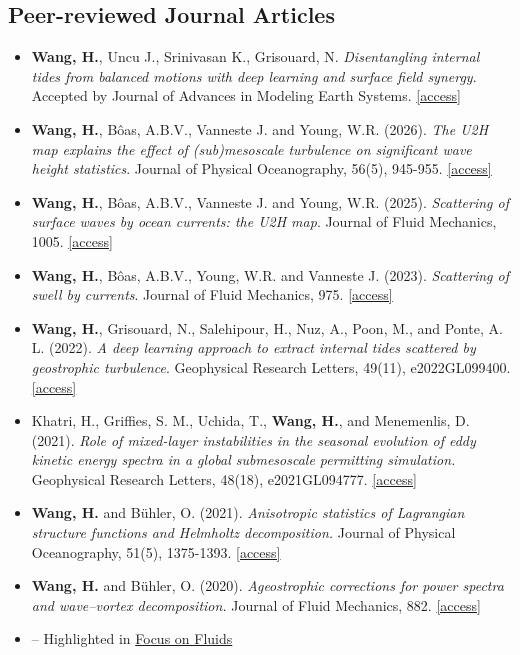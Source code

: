 \documentclass[a4paper,12pt]{article}
\begin{document}
\subsection{Peer-reviewed Journal Articles}
\begin{itemize}
\item \textbf{Wang, H.}, Uncu J., Srinivasan K., Grisouard, N. \textit{Disentangling internal tides from balanced motions with deep learning and surface field synergy}. Accepted by Journal of Advances in Modeling Earth Systems. \href{https://arxiv.org/html/2511.03614v2}{[access]}
\item \textbf{Wang, H.}, B\^{o}as, A.B.V.,  Vanneste J. and Young, W.R. (2026). \textit{The U2H map explains the effect of (sub)mesoscale turbulence on significant wave height statistics}. Journal of Physical Oceanography, 56(5), 945-955. \href{https://arxiv.org/abs/2504.21736}{[access]}
\item \textbf{Wang, H.}, B\^{o}as, A.B.V.,  Vanneste J. and Young, W.R. (2025). \textit{Scattering of surface waves by ocean currents: the U2H map}. Journal of Fluid Mechanics,  1005. \href{https://arxiv.org/abs/2402.05652}{[access]}
\item \textbf{Wang, H.}, B\^{o}as, A.B.V., Young, W.R. and Vanneste J. (2023). \textit{Scattering of swell by currents}. Journal of Fluid Mechanics, 975.  \href{https://arxiv.org/abs/2305.12163}{[access]}
\item \textbf{Wang, H.}, Grisouard, N., Salehipour, H., Nuz, A., Poon, M., and Ponte, A. L. (2022). \textit{A deep learning approach to extract internal tides scattered by geostrophic turbulence}. Geophysical Research Letters, 49(11), e2022GL099400. \href{https://essopenarchive.org/doi/full/10.1002/essoar.10508849.2}{[access]}
\item Khatri, H., Griffies, S. M., Uchida, T., \textbf{Wang, H.},  and Menemenlis, D. (2021). \textit{Role of mixed-layer instabilities in the seasonal evolution of eddy kinetic energy spectra in a global submesoscale permitting simulation.} Geophysical Research Letters, 48(18), e2021GL094777. \href{https://repository.library.noaa.gov/view/noaa/43143}{[access]}
\item \textbf{Wang, H.} and B{\"u}hler, O. (2021). \textit{Anisotropic statistics of Lagrangian structure functions and Helmholtz decomposition.} Journal of Physical Oceanography, 51(5), 1375-1393. \href{https://hannnwang.github.io/WangBuhlerJPO21.pdf}{[access]}
\item \textbf{Wang, H.} and B{\"u}hler, O. (2020). \textit{Ageostrophic corrections for power spectra and wave–vortex decomposition.} Journal of Fluid Mechanics, 882. \href{https://hannnwang.github.io/AgeoSpectraJFM20.pdf}{[access]}
\item[] -- Highlighted in \href{https://www.cambridge.org/core/journals/journal-of-fluid-mechanics/article/untangling-waves-and-vortices-in-the-atmospheric-kinetic-energy-spectra/1BEB1ABC32CD2CFAB99BAFEE4712CD0C}{Focus on Fluids}
\end{itemize}
\end{document}
